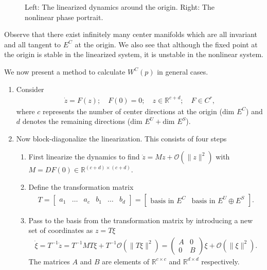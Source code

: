 \begin{ex}
\begin{figure}[h!]
		\caption{Left: The linearized dynamics around the origin. Right: The nonlinear phase portrait. }
		\label{fig:cmfd_lin_ex}
	\end{figure}
	Observe that there exist infinitely many center manifolds which are all invariant and all tangent to $E^{C}$ at the origin. We also see that although the fixed point at the origin is stable in the linearized system, it is unstable in the nonlinear system.
\end{ex}

We now present a method to calculate $W^C(p)$ in general cases.
\begin{enumerate}
	\item Consider 
		\begin{align}
			\dot{z} = F(z); \quad F(0) = 0;\quad z \in \mathbb{R}^{c+d};\quad F \in C^{r},
		\end{align}
	where $c$ represents the number of center directions at the origin ($ \textrm{dim }E^{C}$) and $d$ denotes the remaining directions ($ \textrm{dim } E^{U} +  \textrm{dim } E^{S}$).
	\item Now block-diagonalize the linearization. This consists of four steps
		\begin{enumerate}
			\item First linearize the dynamics to find $\dot{z} = Mz + \mathcal{O}(\|z\|^2)$ with $M = DF(0) \in \mathbb{R}^{(c+d) \times (c+d)}$.
			\item Define the transformation matrix
				\begin{align}
					T=
					\begin{bmatrix}
						a_1 & \ldots & a_c & b_1 & \ldots & b_d	
					\end{bmatrix}
				=
				\begin{bmatrix}
					\textrm{basis in } E^{C} &  \textrm{basis in } E^{U} \oplus E^{S}
				\end{bmatrix}
				.
				\end{align}
			\item Pass to the basis from the transformation matrix by introducing a new set of coordinates as $z = T \xi$
				\begin{align}
					\dot{\xi} = T^{-1}\dot{z} = T^{-1}MT \xi + T^{-1}\mathcal{O}(\| T\xi\|^2) = 
					\begin{pmatrix}
						A & 0 \\
						0 & B
					\end{pmatrix}
					\xi + \mathcal{O}(\| \xi \| ^2).
				\end{align}
			The matrices $A$ and $B$ are elements of $\mathbb{R}^{c \times c}$ and $\mathbb{R}^{d \times d}$ respectively.	

\end{enumerate}
\end{enumerate}

